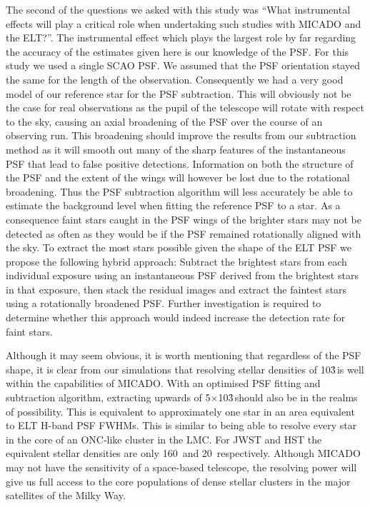 The second of the questions we asked with this study was ``What instrumental effects will play a critical role when undertaking such studies with MICADO and the ELT?''. 
The instrumental effect which plays the largest role by far regarding the accuracy of the estimates given here is our knowledge of the PSF.
For this study we used a single SCAO PSF. 
We assumed that the PSF orientation stayed the same for the length of the observation.
Consequently we had a very good model of our reference star for the PSF subtraction. 
This will obviously not be the case for real observations as the pupil of the telescope will rotate with respect to the sky, causing an axial broadening of the PSF over the course of an observing run. 
This broadening should improve the results from our subtraction method as it will smooth out many of the sharp features of the instantaneous PSF that lead to false positive detections. 
Information on both the structure of the PSF and the extent of the wings will however be lost due to the rotational broadening. 
Thus the PSF subtraction algorithm will less accurately be able to estimate the background level when fitting the reference PSF to a star. 
As a consequence faint stars caught in the PSF wings of the brighter stars may not be detected as often as they would be if the PSF remained rotationally aligned with the sky. 
To extract the most stars possible given the shape of the ELT PSF we propose the following hybrid approach: Subtract the brightest stars from each individual exposure using an instantaneous PSF derived from the brightest stars in that exposure, then stack the residual images and extract the faintest stars using a rotationally broadened PSF.
Further investigation is required to determine whether this approach would indeed increase the detection rate for faint stars.

Although it may seem obvious, it is worth mentioning that regardless of the PSF shape, it is clear from our simulations that resolving stellar densities of 10\h3\,\spa is well within the capabilities of MICADO. 
With an optimised PSF fitting and subtraction algorithm, extracting upwards of 5$\times$10\h3\,\spa should also be in the realms of possibility. 
This is equivalent to approximately one star in an area equivalent to  ELT H-band PSF FWHMs. 
This is similar to being able to resolve every star in the core of an ONC-like cluster in the LMC. 
For JWST and HST the equivalent stellar densities are only 160~\spa and 20~\spa respectively. 
Although MICADO may not have the sensitivity of a space-based telescope, the resolving power will give us full access to the core populations of dense stellar clusters in the major satellites of the Milky Way.


